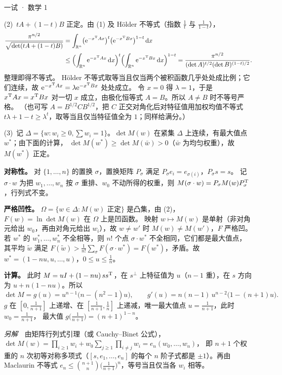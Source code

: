 \documentclass[cjk=noto, seal=first]{mojing-exam}
\begin{document}
\begin{paper}[time={建议 3 小时（训练设置）}, full=150]{一试 · 数学 1}
\begin{questions}
\begin{solution}
(2)~$tA+(1-t)B$ 正定。由 (1) 及 Hölder 不等式（指数 $\frac1t$ 与 $\frac1{1-t}$），
\begin{align*}
  \frac{\pi^{n/2}}{\sqrt{\det(tA+(1-t)B)}}&=\int_{\mathbb{R}^n}\bigl(\mathrm{e}^{-x^{\mathrm{T}} Ax}\bigr)^t\bigl(\mathrm{e}^{-x^{\mathrm{T}} Bx}\bigr)^{1-t}\mathop{}\!\mathrm{d} x\\
  &\le\Bigl(\int_{\mathbb{R}^n}\mathrm{e}^{-x^{\mathrm{T}} Ax}\mathop{}\!\mathrm{d} x\Bigr)^t\Bigl(\int_{\mathbb{R}^n}\mathrm{e}^{-x^{\mathrm{T}} Bx}\mathop{}\!\mathrm{d} x\Bigr)^{1-t}
  =\frac{\pi^{n/2}}{(\det A)^{t/2}(\det B)^{(1-t)/2}} .
\end{align*}
整理即得不等式。
Hölder 不等式取等当且仅当两个被积函数几乎处处成比例；它们连续，故 $\mathrm{e}^{-x^{\mathrm{T}} Ax}=\lambda\mathrm{e}^{-x^{\mathrm{T}} Bx}$ 处处成立。
令 $x=0$ 得 $\lambda=1$，于是 $x^{\mathrm{T}} Ax=x^{\mathrm{T}} Bx$ 对一切 $x$ 成立，由极化恒等式 $A=B$。所以 $A\ne B$ 时不等号严格。
（也可写 $A=B^{1/2}CB^{1/2}$，把 $C$ 正交对角化后对特征值用加权均值不等式 $t\lambda+1-t\ge\lambda^t$，取等当且仅当特征值全为 $1$；同样给满分。）

(3)~记 $\Delta=\{w:w_i\ge0,\sum w_i=1\}$。$\det M(w)$ 在紧集 $\Delta$ 上连续，有最大值点 $w^*$；由下面的计算，
$\det M(w^*)\ge\det M(\bar w)>0$（$\bar w$ 为均匀权重），故 $M(w^*)$ 正定。

\textbf{对称性。} 对 $\{1,\dots,n\}$ 的置换 $\sigma$，置换矩阵 $P_\sigma$ 满足 $P_\sigma e_i=e_{\sigma(i)}$，$P_\sigma s=s$。
记 $\sigma\cdot w$ 为把 $w_1,\dots,w_n$ 按 $\sigma$ 重排、$w_0$ 不动所得的权重，则 $M(\sigma\cdot w)=P_\sigma M(w)P_\sigma^{\mathrm{T}}$，行列式不变。

\textbf{严格凹性。} $\Omega=\{w\in\Delta:M(w)\text{ 正定}\}$ 是凸集，由 (2)，$F(w)=\ln\det M(w)$ 在 $\Omega$ 上是凹函数。
映射 $w\mapsto M(w)$ 是单射（非对角元给出 $w_0$，再由对角元给出 $w_i$），故 $w\ne w'$ 时 $M(w)\ne M(w')$，$F$ 严格凹。
若 $w^*$ 的 $w_1^*,\dots,w_n^*$ 不全相等，则 $n!$ 个点 $\sigma\cdot w^*$ 不全相同，它们都是最大值点，其平均 $\tilde w$ 满足
$F(\tilde w)>\frac1{n!}\sum_\sigma F(\sigma\cdot w^*)=F(w^*)$，矛盾。故 $w^*=(1-nu,u,\dots,u)$，$0\le u\le\frac1n$。

\textbf{计算。} 此时 $M=uI+(1-nu)\,ss^{\mathrm{T}}$，在 $s^\perp$ 上特征值为 $u$（$n-1$ 重），在 $s$ 方向为 $u+n(1-nu)$。所以
\[
  \det M=g(u)=u^{n-1}\bigl(n-(n^2-1)u\bigr),\qquad g'(u)=n(n-1)\,u^{n-2}\bigl(1-(n+1)u\bigr).
\]
$g$ 在 $[0,\frac1{n+1}]$ 上递增、在 $[\frac1{n+1},\frac1n]$ 上递减，唯一最大值点 $u=\frac1{n+1}$，此时 $w_0=\frac1{n+1}$，
最大值 $g\bigl(\frac1{n+1}\bigr)=(n+1)^{1-n}$。

\emph{另解}　由矩阵行列式引理（或 Cauchy–Binet 公式），$\det M(w)=\prod_{i\ge1}w_i+w_0\sum_{j\ge1}\prod_{i\ne j}w_i=e_n(w_0,\dots,w_n)$，
即 $n+1$ 个权重的 $n$ 次初等对称多项式（$[s,e_1,\dots,e_n]$ 的每个 $n$ 阶子式都是 $\pm1$）。再由 Maclaurin 不等式
$e_n\le\binom{n+1}{n}\bigl(\frac1{n+1}\bigr)^n$，等号当且仅当各 $w_i$ 相等。


\end{solution}
\end{questions}
\end{paper}
\end{document}

